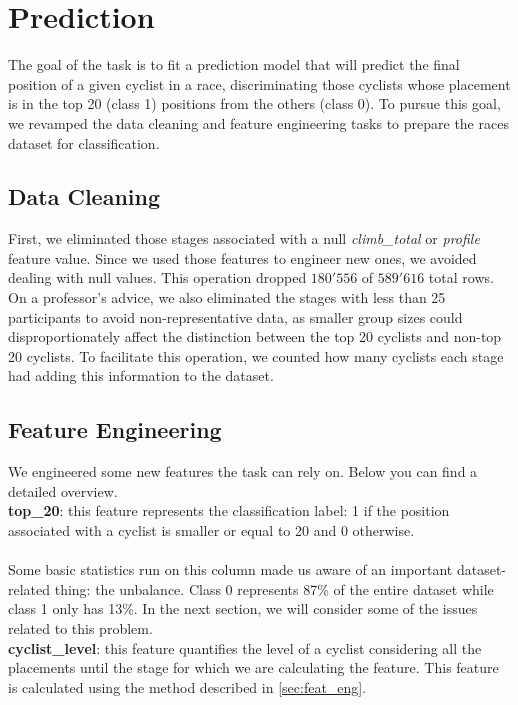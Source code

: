 \section{Prediction}
The goal of the task is to fit a prediction model that will predict the final position of a given cyclist in a race, discriminating those cyclists whose placement is in the top 20 (class 1) positions from the others (class 0). To pursue this goal, we revamped the data cleaning and feature engineering tasks to prepare the races dataset for classification.

\subsection{Data Cleaning}
First, we eliminated those stages associated with a null \textit{climb\_total} or \textit{profile} feature value. Since we used those features to engineer new ones, we avoided dealing with null values. This operation dropped $180'556$ of $589'616$ total rows. On a professor's advice, we also eliminated the stages with less than 25 participants to avoid non-representative data, as smaller group sizes could disproportionately affect the distinction between the top 20 cyclists and non-top 20 cyclists. To facilitate this operation, we counted how many cyclists each stage had adding this information to the dataset.

\subsection{Feature Engineering}
We engineered some new features the task can rely on. Below you can find a detailed overview. \\

\noindent
\textbf{top\_20}: this feature represents the classification label: 1 if the position associated with a cyclist is smaller or equal to 20 and 0 otherwise.\\ \\
Some basic statistics run on this column made us aware of an important dataset-related thing: the unbalance. Class 0 represents 87\% of the entire dataset while class 1 only has 13\%. In the next section, we will consider some of the issues related to this problem. \\

\noindent
\textbf{cyclist\_level}: this feature quantifies the level of a cyclist considering all the placements until the stage for which we are calculating the feature. This feature is calculated using the method described in \autoref{sec:feat_eng}. \\

